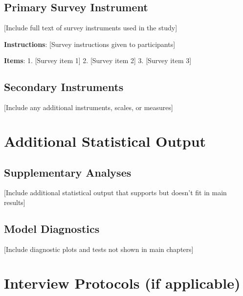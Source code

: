 \documentclass[
  12pt,
  letterpaper,
  12pt,
  letterpaper,
  oneside]{report}
\begin{document}

\subsection*{Primary Survey Instrument}\label{primary-survey-instrument}

{[}Include full text of survey instruments used in the study{]}

\textbf{Instructions}: {[}Survey instructions given to participants{]}

\textbf{Items}: 1. {[}Survey item 1{]} 2. {[}Survey item 2{]} 3.
{[}Survey item 3{]}

\subsection*{Secondary Instruments}\label{secondary-instruments-1}

{[}Include any additional instruments, scales, or measures{]}

\section*{Additional Statistical
Output}\label{additional-statistical-output}


\subsection*{Supplementary Analyses}\label{supplementary-analyses}

{[}Include additional statistical output that supports but doesn't fit
in main results{]}

\subsection*{Model Diagnostics}\label{model-diagnostics}

{[}Include diagnostic plots and tests not shown in main chapters{]}

\section*{Interview Protocols (if
applicable)}\label{interview-protocols-if-applicable}
\end{document}
